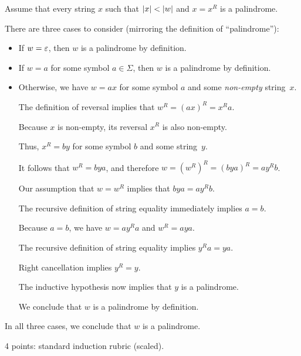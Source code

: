 \documentclass[11pt]{article}
\begin{document}
\begin{enumerate}
\begin{enumerate}
\begin{Solution}
Assume that every string $x$ such that $\mathopen| x \mathclose| < \mathopen| w \mathclose|$ and $x = x^R$ is a palindrome.

There are three cases to consider (mirroring the definition of “palindrome”):
\begin{itemize}\parskip0.25ex
\item 
If $w = \varepsilon$, then $w$ is a palindrome by definition.

\item 
If $w = a$ for some symbol $a\in\Sigma$, then $w$ is a palindrome by definition.

\item
Otherwise, we have $w = ax$ for some symbol $a$ and some \emph{non-empty} string~$x$.
  
The definition of reversal implies that $w^R = (ax)^R = x^R a$.

Because $x$ is non-empty, its reversal $x^R$ is also non-empty.

Thus, $x^R = by$ for some symbol $b$ and some string~$y$.

It follows that $w^R = bya$, and therefore $w = (w^R)^R = (bya)^R = a y^R b$.

\medskip
{}
\medskip

Our assumption that $w = w^R$ implies that $bya = a y^R b$.

The recursive definition of string equality immediately implies $a=b$.

\medskip
Because $a=b$, we have $w = ay^Ra$ and $w^R = a y a$.

The recursive definition of string equality implies $y^Ra = ya$.

Right cancellation implies $y^R = y$.

The inductive hypothesis now implies that $y$ is a palindrome.

\medskip
We conclude that $w$ is a palindrome by definition.
\end{itemize}
In all three cases, we conclude that $w$ is a palindrome.\needqedtrue\EOS
\end{Solution}
\unskip
\begin{rubric}
4 points: standard induction rubric (scaled).
\end{rubric}

\end{enumerate}




\end{enumerate}
\end{document}
